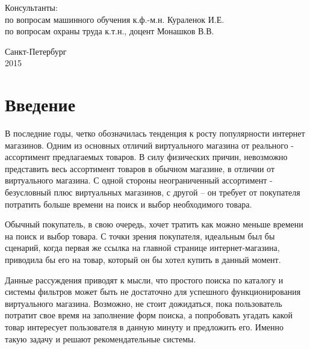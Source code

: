\documentclass[12pt,a4paper]{report}
\begin{document}
\begin{titlepage}
\begin{center}
\begin{flushleft}
Консультанты:\\
\vspace*{0.3cm}
по вопросам машинного обучения к.ф.-м.н. \hrulefill Кураленок И.Е.\\
\vspace*{0.3cm}
по вопросам охраны труда к.т.н., доцент \hrulefill Монашков В.В.\\
\end{flushleft}
\vspace{\fill}

\end{center}
\vfill
\begin{center}
{\large Санкт-Петербург \\ 2015}
\end {center}
\end{titlepage}

\tableofcontents %
\pagebreak

\chapter{Введение}
В последние годы, четко обозначилась тенденция к росту популярности интернет магазинов. Одним из основных отличий виртуального магазина от реального - ассортимент предлагаемых товаров. В силу физических причин, невозможно представить весь ассортимент товаров в обычном магазине, в отличии от виртуального магазина. С одной стороны неограниченный ассортимент - безусловный плюс виртуальных магазинов, с другой -- он требует от покупателя потратить больше времени на поиск и выбор необходимого товара.

Обычный покупатель, в свою очередь, хочет тратить как можно меньше времени на поиск и выбор товара. С точки зрения покупателя, идеальным был бы сценарий, когда первая же ссылка на главной странице интернет-магазина, приводила бы его на товар, который он бы хотел купить в данный момент.

Данные рассуждения приводят к мысли, что простого поиска 
по каталогу и системы фильтров может быть не достаточно для успешного функционирования виртуального магазина. Возможно, не стоит дожидаться, пока пользователь потратит свое время на заполнение форм поиска, а попробовать угадать какой товар интересует пользователя в данную минуту и предложить его. Именно такую задачу и решают рекомендательные системы.
\end{document}
